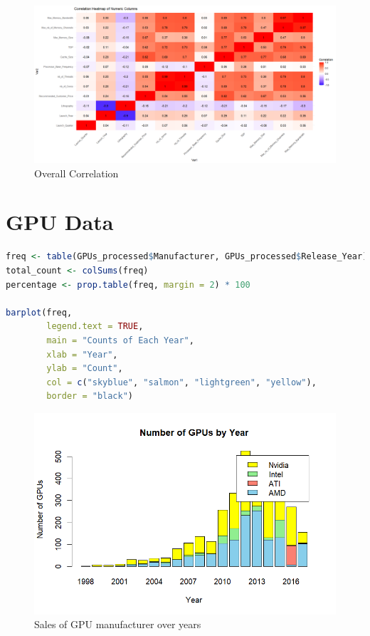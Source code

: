 \begin{figure}[ht]
  \centering
  \includegraphics[width=1\linewidth]{img/CPU_cor.png}
  \vspace{1pt}
  \caption{Overall Correlation}
\end{figure}

\section{GPU Data}

\begin{lstlisting}[language=R]
freq <- table(GPUs_processed$Manufacturer, GPUs_processed$Release_Year)
total_count <- colSums(freq)
percentage <- prop.table(freq, margin = 2) * 100

barplot(freq,
        legend.text = TRUE,
        main = "Counts of Each Year",
        xlab = "Year",
        ylab = "Count",
        col = c("skyblue", "salmon", "lightgreen", "yellow"),
        border = "black")
\end{lstlisting}

\begin{figure}[ht]
  \centering
  \includegraphics[width=1\linewidth]{img/Market_Year.png}
  \vspace{1pt}
  \caption{Sales of GPU manufacturer over years}
\end{figure}

